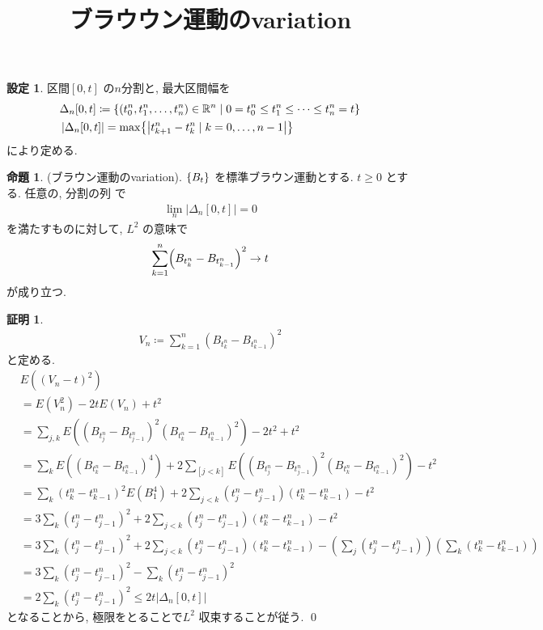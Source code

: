 \documentclass[10pt, fleqn, label-section=none]{bxjsarticle}
\title{ブラウウン運動のvariation}
\date{}
\author{}
\theoremstyle{definition}
\newtheorem{prop}[dfn]{命題}
\newtheorem{setting}[dfn]{設定}
\newtheorem*{pf*}{証明}
\newcommand{\paren}[1]{\mleft( #1\mright )}
\newcommand{\cbra}[1]{\mleft\{#1\mright\}}
\newcommand{\abs}[1]{\left|#1\right|}
\renewcommand{\;}{\, ; \,}
\begin{document}
\maketitle

\section{}


\begin{setting}
区間$[0,t]$ の$n$分割と, 最大区間幅を 
\begin{align*} &\Delta_n [0,t] \coloneqq \cbra{(t_0^n, t_1^n, \ldots, t_n^n) \in \mathbb R^n \mid 0 = t_0^n \leq t_1^n \leq \cdots \leq t_n^n = t }\\
&\abs{\Delta_n[0,t] } = \max \cbra{\abs{t_{k+1}^n - t_k^n \mid k = 0, \ldots, n-1}}
\end{align*}
により定める. 


\end{setting}


\begin{prop}(ブラウン運動のvariation). $\cbra{B_t}$ を標準ブラウン運動とする. $t \geq 0 $ とする. 任意の, 分割の列 で
\begin{align*} \lim_n \abs{\Delta_n [0,t]} = 0 \end{align*}
を満たすものに対して, $L^2$ の意味で
\begin{align*} \sum_{k=1}^n \paren{B_{t^n_k} - B_{t^n_{k-1} } }^2 \rightarrow  t \end{align*}
が成り立つ.
\end{prop}
\begin{pf*}
\begin{align*} V_n \coloneqq \sum_{k=1} ^n (     B_{t^n_k} - B_{t^n_{k-1} }    ) ^2 \end{align*}
と定める. 
\begin{align*} &E((V_n - t)^2) \\
&= E(V_n^2) - 2tE(V_n) + t^2 \\
&= \sum_{j, k} E( ( B_{t^n_j} - B_{t^n_{j-1} }  ) ^2 ( B_{t^n_k} - B_{t^n_{k-1} }  )^2 ) - 2t^2 + t^2 \\
&= \sum_{k} E(( B_{t^n_k} - B_{t^n_{k-1} }  ) ^4) + 2 \sum_[j < k] E(( B_{t^n_j} - B_{t^n_{j-1} }  ) ^2 ( B_{t^n_k} - B_{t^n_{k-1} }  ) ^2 ) - t^2 \\
&= \sum_k (t^n_k - t^n_{k-1}) ^2 E(B_1 ^4) + 2 \sum_{j < k} (t^n_j - t^n_{j-1}) (t^n_k - t^n_{k-1} ) - t^2 \\
&= 3 \sum_k  (t^n_j - t^n_{j-1}) ^2 + 2 \sum_{j < k} (t^n _j - t^n_{j-1}) (t^n_k - t^n_{k-1}) - t^2 \\
&= 3 \sum_k  (t^n_j - t^n_{j-1}) ^2 + 2 \sum_{j < k} (t^n _j - t^n_{j-1}) (t^n_k - t^n_{k-1})  - (\sum_j (t^n _j - t^n_{j-1})) (\sum_k (t^n _k - t^n_{k-1})) \\
&= 3 \sum_k (t^n_j - t^n_{j-1}) ^2  - \sum_k  (t^n_j - t^n_{j-1}) ^2  \\
&= 2  \sum_k (t^n_j - t^n_{j-1}) ^2 \leq 2t \abs{\Delta_n [0,t]}
 \end{align*}
 となることから, 極限をとることで$L^2$ 収束することが従う. 
\qed
\end{pf*}
\end{document}
